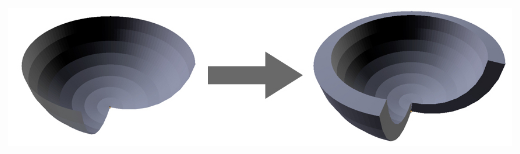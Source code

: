 \begin{figureth}
\begin{subfigureth}{0.45\textwidth}
		\caption{\gls{screw}.}
	\end{subfigureth}
	\qquad
	\begin{subfigureth}{0.45\textwidth}
		\includegraphics[width=\linewidth]{images/solidify}
		\caption{\gls{solidify}.}
	\end{subfigureth}
\caption{Illustration de quatre exemples de \glspl{modifier} \textit{Blender}.}	
\label{exempleModifier}
\end{figureth}		

